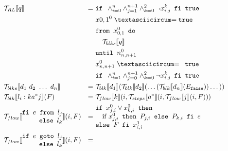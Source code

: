 \begin{figure}[H]
  $$\begin{aligned}
    & \mathcal{T}_{RL}\llbracket q\rrbracket  & =\ & \texttt{if } \land_{i=0}^n\land_{j=1}^{n+1}\land_{k=0}^2\neg x_{i,j}^k\texttt{ fi true}\\
    &                                         &    & x{0,1}^{0} \xoreq \texttt{true}\\
    &                                         &    & \texttt{from }x_{0,1}^0\texttt{ do}\\
    &                                         &    & \quad \mathcal{T}_{blks}\llbracket q\rrbracket\\
    &                                         &    & \texttt{until } n_{n,n+1}^0\\
    &                                         &    & x_{n,n+1}^0 \xoreq \texttt{ true}\\
    &                                         &    & \texttt{if } \land_{i=1}^n\land_{j=0}^{n+1}\land_{k=0}^2\neg x_{i,j}^k\texttt{ fi true}\\
    & \mathcal{T}_{blks}\llbracket d_1\ d_2\ \dots\ d_n\rrbracket & =\ &
      \mathcal{T}_{blk}\llbracket d_1 \rrbracket(\mathcal{T}_{blk}\llbracket d_2\rrbracket(\dots(\mathcal{T}_{blk}\llbracket d_n\rrbracket(E_\texttt{false}))\dots))\\
    & \mathcal{T}_{blk}\llbracket l_i : k a^* j \rrbracket(F) & =\ &
      \mathcal{T}_{flow}\llbracket k\rrbracket(i,\mathcal{T}_{steps}\llbracket a^*\rrbracket(i,\mathcal{T}_{flow}\llbracket j\rrbracket(i,F)))\\
    & \mathcal{T}_{flow}\llbracket\begin{matrix*}[r]\texttt{fi }e\texttt{ from }l_j\\\texttt{else }l_k\end{matrix*}\rrbracket(i,F) & =\ &
      \begin{matrix*}[l]
        \texttt{if }x_{j,i}^0\lor x_{k,i}^0\texttt{ then}\\
        \quad\text{if }x_{j,i}^0\texttt{ then }P_{j,i}\texttt{ else }P_{k,i}\texttt{ fi }e\\
        \texttt{else }F\texttt{ fi }x_{i,i}^1\\
      \end{matrix*}\\
    & \mathcal{T}_{flow}\llbracket\begin{matrix*}[r]\texttt{if }e\texttt{ goto }l_j\\\texttt{else }l_k\end{matrix*}\rrbracket(i,F) & =\ &

\end{aligned}$$
\end{figure}
